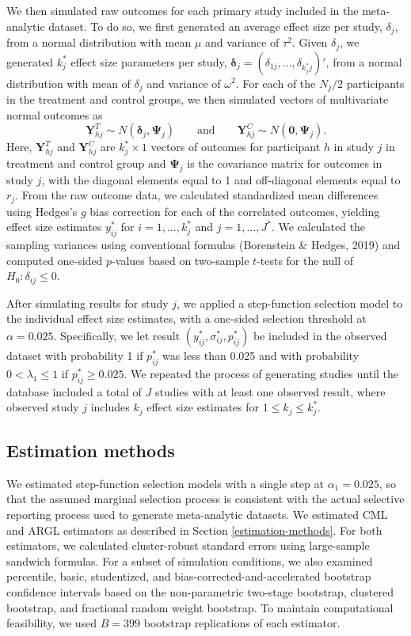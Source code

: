 \documentclass[
  american,
  man, donotrepeattitle,floatsintext]{apa7}
\begin{document}
We then simulated raw outcomes for each primary study included in the
meta-analytic dataset. To do so, we first generated an average effect
size per study, \(\delta_j\), from a normal distribution with mean \(\mu\) and variance
of \(\tau^2\). Given \(\delta_j\), we generated \(k_j^*\) effect size parameters per study, \(\boldsymbol\delta_j = \left(\delta_{1j},...,\delta_{k_j^* j}\right)'\), from a normal distribution with mean of \(\delta_j\) and
variance of \(\omega^2\).
For each of the \(N_j / 2\) participants in the treatment and control groups, we then simulated vectors of multivariate normal outcomes as
\[
\mathbf{Y}_{hj}^T \sim N(\boldsymbol\delta_j, \boldsymbol\Psi_j) \qquad \text{and} \qquad
\mathbf{Y}_{hj}^C \sim N(\mathbf{0}, \boldsymbol\Psi_j).
\]
Here, \(\mathbf{Y}_{hj}^T\) and \(\mathbf{Y}_{hj}^C\) are
\(k_j^* \times 1\) vectors of outcomes for participant \(h\) in study \(j\) in
treatment and control group and \(\boldsymbol\Psi_j\) is the covariance matrix for outcomes in study \(j\), with the diagonal elements equal to 1 and off-diagonal elements equal to \(r_j\).
From the raw outcome data, we calculated standardized mean
differences using Hedges's \(g\) bias correction for each of the correlated outcomes, yielding effect size estimates \(y^*_{ij}\) for \(i=1,...,k_j^*\) and \(j = 1,...,J^*\).
We calculated the sampling variances using conventional formulas (Borenstein \& Hedges, 2019) and computed one-sided \(p\)-values based on two-sample \(t\)-tests for the null of \(H_0: \delta_{ij} \leq 0\).

After simulating results for study \(j\), we applied a step-function selection
model to the individual effect size estimates, with a one-sided selection
threshold at \(\alpha = 0.025\). Specifically, we let result \((y^*_{ij},
\sigma_{ij}^*, p_{ij}^*)\) be included in the observed dataset with probability
1 if \(p_{ij}^*\) was less than 0.025 and with probability \(0 < \lambda_1 \leq 1\) if \(p_{ij}^* \ge 0.025\).
We repeated the process of generating studies until the database included a total of \(J\) studies with at least one observed result, where observed study \(j\) includes \(k_j\) effect size estimates for \(1 \leq k_j \leq k_j^*\).

\subsection{Estimation methods}\label{estimation-methods-1}

We estimated step-function selection models with a single step at \(\alpha_1 = 0.025\), so that the assumed marginal selection process is consistent with the actual selective reporting process used to generate meta-analytic datasets.
We estimated CML and ARGL estimators as described in Section \ref{estimation-methods}.
For both estimators, we calculated cluster-robust standard errors using large-sample sandwich formulas.
For a subset of simulation conditions, we also examined percentile, basic, studentized, and bias-corrected-and-accelerated bootstrap confidence intervals based on the non-parametric two-stage bootstrap, clustered bootstrap, and fractional random weight bootstrap.
To maintain computational feasibility, we used \(B = 399\) bootstrap replications of each estimator.
\end{document}
